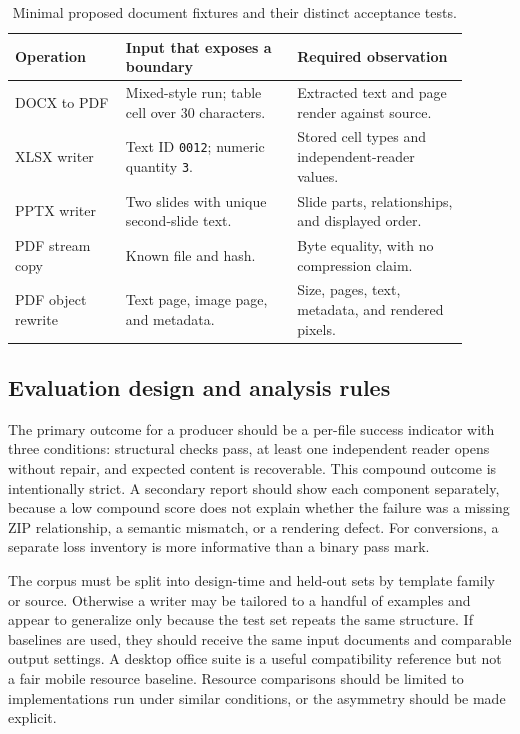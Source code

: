 \documentclass[10pt,letterpaper]{article}
\begin{document}
\begin{table}[H]
\centering\small
\caption{Minimal proposed document fixtures and their distinct acceptance tests.}
\label{tab:doc-fixtures}
\begin{tabular}{@{}>{\raggedright\arraybackslash}p{0.22\linewidth}>{\raggedright\arraybackslash}p{0.34\linewidth}>{\raggedright\arraybackslash}p{0.34\linewidth}@{}}
\toprule
Operation & Input that exposes a boundary & Required observation \\
\midrule
DOCX to PDF & Mixed-style run; table cell over 30 characters. & Extracted text and page render against source. \\
XLSX writer & Text ID \texttt{0012}; numeric quantity \texttt{3}. & Stored cell types and independent-reader values. \\
PPTX writer & Two slides with unique second-slide text. & Slide parts, relationships, and displayed order. \\
PDF stream copy & Known file and hash. & Byte equality, with no compression claim. \\
PDF object rewrite & Text page, image page, and metadata. & Size, pages, text, metadata, and rendered pixels. \\
\bottomrule
\end{tabular}
\end{table}


\subsection{Evaluation design and analysis rules}

The primary outcome for a producer should be a per-file success indicator with three conditions: structural checks pass, at least one independent reader opens without repair, and expected content is recoverable. This compound outcome is intentionally strict. A secondary report should show each component separately, because a low compound score does not explain whether the failure was a missing ZIP relationship, a semantic mismatch, or a rendering defect. For conversions, a separate loss inventory is more informative than a binary pass mark.

The corpus must be split into design-time and held-out sets by template family or source. Otherwise a writer may be tailored to a handful of examples and appear to generalize only because the test set repeats the same structure. If baselines are used, they should receive the same input documents and comparable output settings. A desktop office suite is a useful compatibility reference but not a fair mobile resource baseline. Resource comparisons should be limited to implementations run under similar conditions, or the asymmetry should be made explicit.
\end{document}
